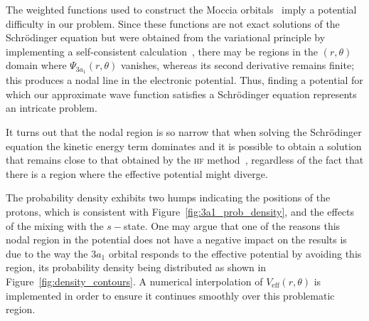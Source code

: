 The weighted functions used to construct the Moccia
orbitals~\cite{Moccia_1964} imply a potential difficulty in our
problem. Since these functions are not exact solutions of the
Schr\"{o}dinger equation but were obtained from the variational
principle by implementing a self-consistent
calculation~\cite{Moccia_JCP_2164}, there may be regions in the
$(r,\theta)$ domain where $\Psi_{3a_{1}}(r,\theta)$ vanishes, whereas
its second derivative remains finite; this produces a nodal line in
the electronic potential. Thus, finding a potential for which our
approximate wave function satisfies a Schr\"{o}dinger equation
represents an intricate problem.

It turns out that the nodal region is so narrow that when solving the
Schr\"{o}dinger equation the kinetic energy term dominates and it is
possible to obtain a solution that remains close to that obtained by
the \textsc{hf} method~\cite{Moccia_1964}, regardless of the fact that
there is a region where the effective potential might diverge.

The probability density exhibits two humps indicating the positions of
the protons, which is consistent with
Figure~\ref{fig:3a1_prob_density}, and the effects of the mixing with
the $s-$state. One may argue that one of the reasons this nodal region
in the potential does not have a negative impact on the results is due
to the way the $3a_{1}$ orbital responds to the effective potential by
avoiding this region, its probability density being distributed as
shown in Figure~\ref{fig:density_contours}. A numerical interpolation
of $V_{\mathrm{eff}}(r,\theta)$ is implemented in order to ensure it
continues smoothly over this problematic region.

